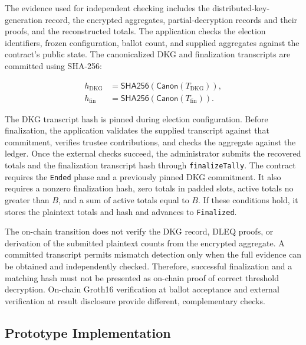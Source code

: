 The evidence used for independent checking includes the
distributed-key-generation record, the encrypted aggregates,
partial-decryption records and their proofs, and the reconstructed
totals. The application checks the election identifiers, frozen
configuration, ballot count, and supplied aggregates against the
contract's public state. The canonicalized DKG and finalization
transcripts are committed using SHA-256:

\begin{equation}
\label{eq:protocol-transcript-hash}
\begin{aligned}
 h_{\mathrm{DKG}}&=\mathsf{SHA256}
 (\mathsf{Canon}(T_{\mathrm{DKG}})),\\
 h_{\mathrm{fin}}&=\mathsf{SHA256}
 (\mathsf{Canon}(T_{\mathrm{fin}})).
\end{aligned}
\end{equation}

The DKG transcript hash is pinned during election configuration.
Before finalization, the application validates the supplied transcript
against that commitment, verifies trustee contributions, and checks the
aggregate against the ledger. Once the external checks succeed, the
administrator submits the recovered totals and the finalization
transcript hash through \texttt{finalizeTally}. The contract requires the
\texttt{Ended} phase and a previously pinned DKG commitment. It also
requires a nonzero finalization hash, zero totals in padded slots,
active totals no greater than $B$, and a sum of active totals equal to
$B$. If these conditions hold, it stores the plaintext totals and hash
and advances to \texttt{Finalized}.

The on-chain transition does not verify the DKG record, DLEQ proofs,
or derivation of the submitted plaintext counts from the encrypted
aggregate. A committed transcript permits mismatch detection only when
the full evidence can be obtained and independently checked. Therefore,
successful finalization and a matching hash must not be presented as
on-chain proof of correct threshold decryption. On-chain Groth16
verification at ballot acceptance and external verification at result
disclosure provide different, complementary checks.

\subsection{Prototype Implementation}
\label{sec:06}
\label{sec:implementation-experiments}
\label{subsec:implementation-profile}

